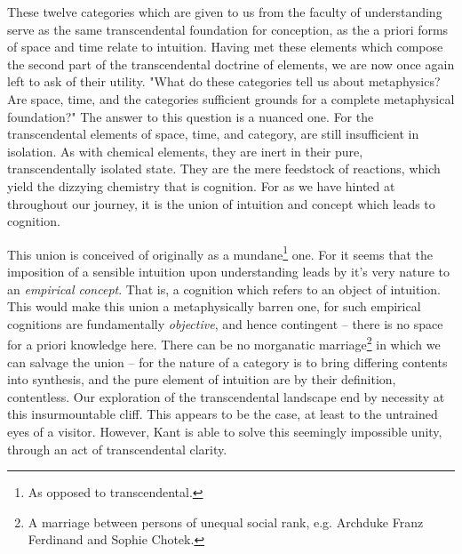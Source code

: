 

\noindent
These twelve categories which are given to us from the faculty of understanding serve as the same transcendental foundation for conception, as the a priori forms of space and time relate to intuition. Having met these elements which compose the second part of the transcendental doctrine of elements, we are now once again left to ask of their utility. "What do these categories tell us about metaphysics? Are space, time, and the categories sufficient grounds for a complete metaphysical foundation?" The answer to this question is a nuanced one. For the transcendental elements of space, time, and category, are still insufficient in isolation. As with chemical elements, they are inert in their pure, transcendentally isolated state. They are the mere feedstock of reactions, which yield the dizzying chemistry that is cognition. For as we have hinted at throughout our journey, it is the union of intuition and concept which leads to cognition.

This union is conceived of originally as a mundane\footnote{As opposed to transcendental.} one. For it seems that the imposition of a sensible intuition upon understanding leads by it's very nature to an \emph{empirical concept}. That is, a cognition which refers to an object of intuition. This would make this union a metaphysically barren one, for such empirical cognitions are fundamentally \emph{objective}, and hence contingent -- there is no space for a priori knowledge here. There can be no morganatic marriage\footnote{A marriage between persons of unequal social rank, e.g. Archduke Franz Ferdinand and Sophie Chotek.} in which we can salvage the union -- for the nature of a category is to bring differing contents into synthesis, and the pure element of intuition are by their definition, contentless. Our exploration of the transcendental landscape end by necessity at this insurmountable cliff. This appears to be the case, at least to the untrained eyes of a visitor. However, Kant is able to solve this seemingly impossible unity, through an act of transcendental clarity.
